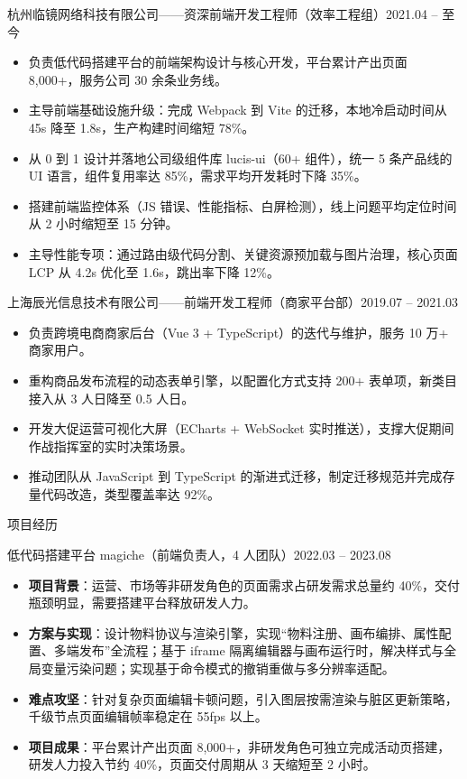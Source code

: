 \documentclass[10.5pt,fontset=windows]{ctexart}
\newcommand{\rsection}[1]{%
  \Needspace*{6\baselineskip}%
  \vspace{9pt}%
  {\color{maincolor}\heiti\zihao{4}#1}\par
  \vspace{1pt}{\color{maincolor}\rule{\textwidth}{1pt}}\par
  \vspace{3pt}}
\newcommand{\entryhead}[2]{%
  \Needspace*{3\baselineskip}%
  {\heiti #1}\hfill{\color{graytext}\small #2}\par\vspace{1pt}}
\begin{document}
\entryhead{杭州临镜网络科技有限公司\quad ——\quad 资深前端开发工程师（效率工程组）}{2021.04 -- 至今}
\begin{itemize}
  \item 负责低代码搭建平台的前端架构设计与核心开发，平台累计产出页面 8,000+，服务公司 30 余条业务线。
  \item 主导前端基础设施升级：完成 Webpack 到 Vite 的迁移，本地冷启动时间从 45s 降至 1.8s，生产构建时间缩短 78\%。
  \item 从 0 到 1 设计并落地公司级组件库 lucis-ui（60+ 组件），统一 5 条产品线的 UI 语言，组件复用率达 85\%，需求平均开发耗时下降 35\%。
  \item 搭建前端监控体系（JS 错误、性能指标、白屏检测），线上问题平均定位时间从 2 小时缩短至 15 分钟。
  \item 主导性能专项：通过路由级代码分割、关键资源预加载与图片治理，核心页面 LCP 从 4.2s 优化至 1.6s，跳出率下降 12\%。
\end{itemize}

\entryhead{上海辰光信息技术有限公司\quad ——\quad 前端开发工程师（商家平台部）}{2019.07 -- 2021.03}
\begin{itemize}
  \item 负责跨境电商商家后台（Vue 3 + TypeScript）的迭代与维护，服务 10 万+ 商家用户。
  \item 重构商品发布流程的动态表单引擎，以配置化方式支持 200+ 表单项，新类目接入从 3 人日降至 0.5 人日。
  \item 开发大促运营可视化大屏（ECharts + WebSocket 实时推送），支撑大促期间作战指挥室的实时决策场景。
  \item 推动团队从 JavaScript 到 TypeScript 的渐进式迁移，制定迁移规范并完成存量代码改造，类型覆盖率达 92\%。
\end{itemize}

\rsection{项目经历}

\entryhead{低代码搭建平台 magiche（前端负责人，4 人团队）}{2022.03 -- 2023.08}
\begin{itemize}
  \item \textbf{项目背景}：运营、市场等非研发角色的页面需求占研发需求总量约 40\%，交付瓶颈明显，需要搭建平台释放研发人力。
  \item \textbf{方案与实现}：设计物料协议与渲染引擎，实现“物料注册、画布编排、属性配置、多端发布”全流程；基于 iframe 隔离编辑器与画布运行时，解决样式与全局变量污染问题；实现基于命令模式的撤销重做与多分辨率适配。
  \item \textbf{难点攻坚}：针对复杂页面编辑卡顿问题，引入图层按需渲染与脏区更新策略，千级节点页面编辑帧率稳定在 55fps 以上。
  \item \textbf{项目成果}：平台累计产出页面 8,000+，非研发角色可独立完成活动页搭建，研发人力投入节约 40\%，页面交付周期从 3 天缩短至 2 小时。
\end{itemize}
\end{document}
